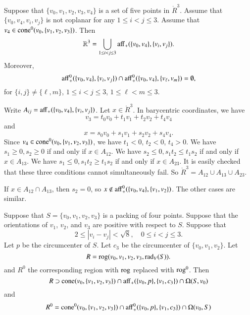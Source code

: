 \begin{tarskidata}
\begin{tarski}

\begin{lemma}
Suppose that $\{v_0,v_1,v_2,v_3,v_4\}$ is a set
of five points in $\ring{R}^3$.  Assume that $\{v_0,v_4,v_i,v_j\}$
is not coplanar for any $1\le i < j \le 3$.
Assume that $v_4\in{\operatorname{cone}}^0(v_0,\{v_1,v_2,v_3\})$.
Then 
   $$
   \mathbb{R}^3 = \bigcup_{1\le i<j\le 3}
    {\operatorname{aff}}_+(\{v_0,v_4\},\{v_i,v_j\}).
   $$
Moreover,
   $$
   {\operatorname{aff}}_+^0(\{v_0,v_4\},\{v_i,v_j\}) \cap
   {\operatorname{aff}}_+^0(\{v_0,v_4\},\{v_\ell,v_m\}) =\emptyset,
   $$
for $\{i,j\}\ne \{\ell,m\}$, $1\le i<j\le 3$, $1\le \ell<m\le 3$.
\end{lemma}

\begin{proved} Write $A_{ij} = {\operatorname{aff}}_+(\{v_0,v_4\},\{v_i,v_j\})$.
  Let $x\in\ring{R}^3$.  In barycentric coordinates, we have
  $$
  v_3 = t_0 v_0 + t_1 v_1 + t_2 v_2 + t_4 v_4
  $$
and
$$
  x = s_0 v_0 + s_1 v_1 + s_2 v_2 + s_4 v_4.
$$
Since $v_4\in{\operatorname{cone}}^0(v_0,\{v_1,v_2,v_3\})$, we have
$t_1<0$, $t_2<0$, $t_4>0$.  
We have $s_1\ge0,s_2\ge0$ if and only if $x\in A_{12}$.
We have $s_2\le0,s_1t_2\le t_1s_2$ if and only if $x\in A_{13}$.
We have $s_1\le0,s_1t_2\ge t_1s_2$ if and only if $x\in A_{23}$.
It is easily checked that these three conditions cannot simultaneously
fail.  So $\ring{R}^3 = A_{12}\cup A_{13}\cup A_{23}$.

If $x\in A_{12}\cap A_{13}$, then $s_2=0$, so $x\not\in{\operatorname{aff}}_+^0(\{v_0,v_4\},\{v_1,v_2\})$.  The other cases are similar.
\swallowed\end{proved}
\end{tarski}





\begin{tarski}

\begin{lemma}
Suppose that $S=\{v_0,v_1,v_2,v_3\}$ is a packing
of four points.  Suppose that 
the orientations of $v_1$, $v_2$, and $v_3$ are positive with respect
to $S$.  Suppose that 
  $$
  2 \le |v_i - v_j | < \sqrt8, \quad 0\le i < j \le 3.
  $$
Let $p$ be the circumcenter of $S$.  Let $c_3$
be the circumcenter of $\{v_0,v_1,v_2\}$.
Let 
   $$
   R = {\operatorname{rog}}(v_0,v_1,v_2,v_3,\operatorname{rad}_V(S)).
   $$
and $R^0$ the corresponding region with ${\operatorname{rog}}$ replaced
with ${\operatorname{rog}}^0$.
Then 
$$
 R \supset {\operatorname{cone}}(v_0,\{v_1,v_2,v_3\})\cap
  {\operatorname{aff}}_+(\{v_0,p\},\{v_1,c_3\}) \cap
  \Omega(S,v_0)
$$ 
and 
$$
 R^0 = {\operatorname{cone}}^0(v_0,\{v_1,v_2,v_3\})\cap
  {\operatorname{aff}}^0_+(\{v_0,p\},\{v_1,c_3\}) \cap
  \Omega(v_0,S)
$$ 
\end{lemma}


\end{tarski}
\end{tarskidata}
